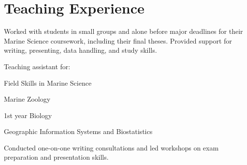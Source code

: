 \documentclass[a4paper]{deedy-resume} %
\begin{document}

\sectionspace %
\sectionspace %



\section{Teaching Experience}



Worked with students in small groups and alone before major deadlines for their Marine Science coursework, including their final theses. Provided support for writing, presenting, data handling, and study skills.

\sectionspace



Teaching assistant for:
\begin{tightitemize}
\item Field Skills in Marine Science
\item Marine Zoology
\item 1st year Biology
\item Geographic Information Systems and Biostatistics
\end{tightitemize}

\sectionspace



Conducted one-on-one writing consultations and led workshops on exam preparation and presentation skills.

\sectionspace %


\end{document}
